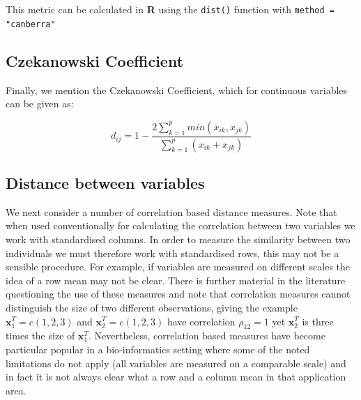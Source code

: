 This metric can be calculated in \textbf{R} using the \verb+dist()+ function with \verb+method = "canberra"+

\subsection{Czekanowski Coefficient}
\label{czekanowski}

Finally, we mention the Czekanowski Coefficient, which for continuous variables can be given as:

\begin{displaymath}
\label{czekanowskiF}
d_{ij} = 1 - \frac{2 \sum_{k=1}^{p} min(x_{ik},x_{jk})}{\sum_{k=1}^{p}(x_{ik} + x_{jk})}
\end{displaymath}



\subsection{Distance between variables}
\label{corrdist}

We next consider a number of correlation based distance measures.   Note that when used conventionally for calculating the correlation between two variables we work with standardised columns.  In order to measure the similarity between two individuals we must therefore work with standardised rows, this may not be a sensible procedure.   For example, if variables are measured on different scales the idea of a row mean may not be clear.   There is further material in the literature questioning the use of these measures \citep{Jardine+Sibson:1971,Fleiss+Zubin:1969} and \cite{Everitt+etal:2001} note that correlation measures cannot distinguish the size of two different observations, giving the example $\boldsymbol{x}^{T}_{1} = c(1,2,3)$ and $\boldsymbol{x}^{T}_{2} = c(1,2,3)$ have correlation $\rho_{12} = 1$ yet $\boldsymbol{x}^{T}_{2}$ is three times the size of $\boldsymbol{x}^{T}_{1}$.   Nevertheless, correlation based measures have become particular popular in a bio-informatics setting where some of the noted limitations do not apply (all variables are measured on a comparable scale) and in fact it is not always clear what a row and a column mean in that application area.   

